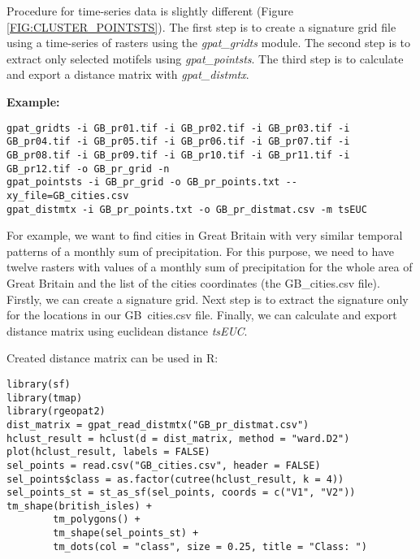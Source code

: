 Procedure for time-series data is slightly different (Figure \ref{FIG:CLUSTER_POINTSTS}).
The first step is to create a signature grid file using a time-series of rasters using the {\it gpat\_gridts} module.
The second step is to extract only selected motifels using {\it gpat\_pointsts}.
The third step is to calculate and export a distance matrix with {\it gpat\_distmtx}.

{\bf Example:}

\begin{minipage}{\linewidth}
\begin{lstlisting}
gpat_gridts -i GB_pr01.tif -i GB_pr02.tif -i GB_pr03.tif -i GB_pr04.tif -i GB_pr05.tif -i GB_pr06.tif -i GB_pr07.tif -i GB_pr08.tif -i GB_pr09.tif -i GB_pr10.tif -i GB_pr11.tif -i GB_pr12.tif -o GB_pr_grid -n
gpat_pointsts -i GB_pr_grid -o GB_pr_points.txt --xy_file=GB_cities.csv
gpat_distmtx -i GB_pr_points.txt -o GB_pr_distmat.csv -m tsEUC 
\end{lstlisting}
\end{minipage}

For example, we want to find cities in Great Britain with very similar temporal patterns of a monthly sum of precipitation. 
For this purpose, we need to have twelve rasters with values of a monthly sum of precipitation for the whole area of Great Britain and the list of the cities coordinates (the GB\_cities.csv file).
Firstly, we can create a signature grid. 
Next step is to extract the signature only for the locations in our GB\ cities.csv file.
Finally, we can calculate and export distance matrix using euclidean distance {\it tsEUC}.

Created distance matrix can be used in R:

\begin{minipage}{\linewidth}
\begin{lstlisting}
library(sf)
library(tmap)
library(rgeopat2)
dist_matrix = gpat_read_distmtx("GB_pr_distmat.csv")
hclust_result = hclust(d = dist_matrix, method = "ward.D2")
plot(hclust_result, labels = FALSE)
sel_points = read.csv("GB_cities.csv", header = FALSE) 
sel_points$class = as.factor(cutree(hclust_result, k = 4))
sel_points_st = st_as_sf(sel_points, coords = c("V1", "V2"))
tm_shape(british_isles) +
        tm_polygons() +
        tm_shape(sel_points_st) +
        tm_dots(col = "class", size = 0.25, title = "Class: ")
\end{lstlisting}
\end{minipage}

